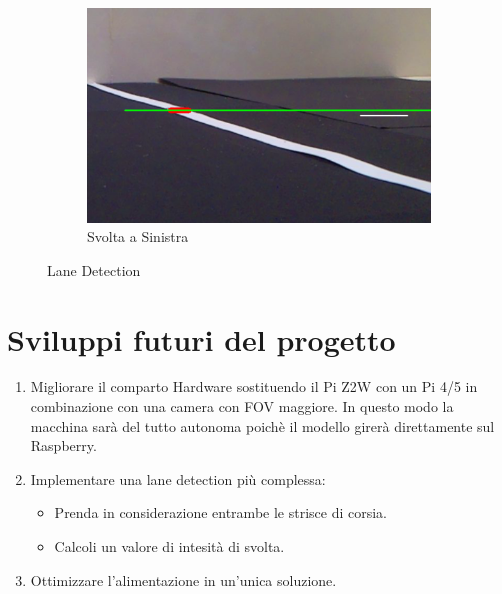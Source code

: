 \documentclass{article}
\begin{document}
\begin{figure}[h!]
    \begin{subfigure}[b]{0.7\linewidth}
        \centering
        \includegraphics[width=\linewidth]{sinistra.png}
        \caption{Svolta a Sinistra}
        \label{fig:sinistra}
    \end{subfigure}

    \caption{Lane Detection}
    \label{fig:posizioni}
\end{figure}

\newpage

\section{Sviluppi futuri del progetto}
\begin{enumerate}
\item Migliorare il comparto Hardware sostituendo il Pi Z2W con un Pi 4/5 in combinazione con una camera con FOV maggiore. In questo modo la macchina sarà del tutto autonoma poichè il modello girerà direttamente sul Raspberry.
\item Implementare una lane detection più complessa:
    \begin{itemize}
    \item Prenda in considerazione entrambe le strisce di corsia.
    \item Calcoli un valore di intesità di svolta.
    \end{itemize}
\item Ottimizzare l'alimentazione in un'unica soluzione.
\end{enumerate}

\newpage

\medskip


\printbibliography
\end{document}
